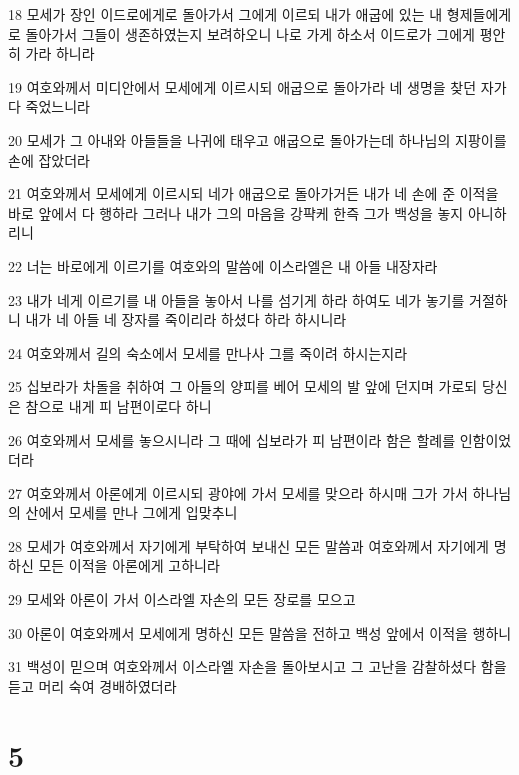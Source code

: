 \par 18 모세가 장인 이드로에게로 돌아가서 그에게 이르되 내가 애굽에 있는 내 형제들에게로 돌아가서 그들이 생존하였는지 보려하오니 나로 가게 하소서 이드로가 그에게 평안히 가라 하니라
\par 19 여호와께서 미디안에서 모세에게 이르시되 애굽으로 돌아가라 네 생명을 찾던 자가 다 죽었느니라
\par 20 모세가 그 아내와 아들들을 나귀에 태우고 애굽으로 돌아가는데 하나님의 지팡이를 손에 잡았더라
\par 21 여호와께서 모세에게 이르시되 네가 애굽으로 돌아가거든 내가 네 손에 준 이적을 바로 앞에서 다 행하라 그러나 내가 그의 마음을 강퍅케 한즉 그가 백성을 놓지 아니하리니
\par 22 너는 바로에게 이르기를 여호와의 말씀에 이스라엘은 내 아들 내장자라
\par 23 내가 네게 이르기를 내 아들을 놓아서 나를 섬기게 하라 하여도 네가 놓기를 거절하니 내가 네 아들 네 장자를 죽이리라 하셨다 하라 하시니라
\par 24 여호와께서 길의 숙소에서 모세를 만나사 그를 죽이려 하시는지라
\par 25 십보라가 차돌을 취하여 그 아들의 양피를 베어 모세의 발 앞에 던지며 가로되 당신은 참으로 내게 피 남편이로다 하니
\par 26 여호와께서 모세를 놓으시니라 그 때에 십보라가 피 남편이라 함은 할례를 인함이었더라
\par 27 여호와께서 아론에게 이르시되 광야에 가서 모세를 맞으라 하시매 그가 가서 하나님의 산에서 모세를 만나 그에게 입맞추니
\par 28 모세가 여호와께서 자기에게 부탁하여 보내신 모든 말씀과 여호와께서 자기에게 명하신 모든 이적을 아론에게 고하니라
\par 29 모세와 아론이 가서 이스라엘 자손의 모든 장로를 모으고
\par 30 아론이 여호와께서 모세에게 명하신 모든 말씀을 전하고 백성 앞에서 이적을 행하니
\par 31 백성이 믿으며 여호와께서 이스라엘 자손을 돌아보시고 그 고난을 감찰하셨다 함을 듣고 머리 숙여 경배하였더라

\chapter{5}

